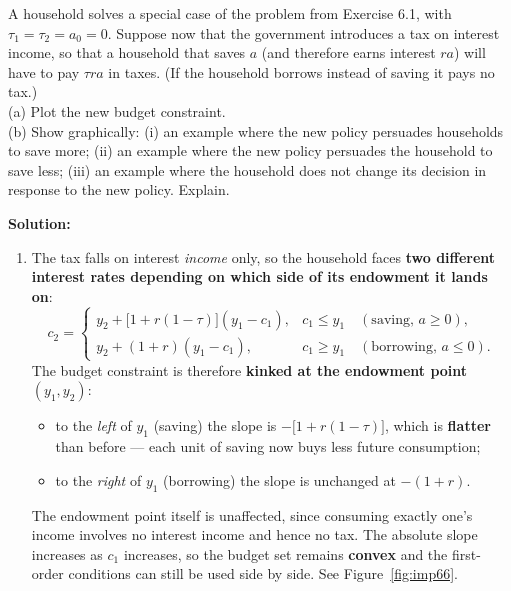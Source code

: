 \documentclass[12pt, letterpaper]{article}
\begin{document}
\begin{tcolorbox}[evenbox,title={Problem 6.6 \quad A Tax on Savings}]
\begin{tcolorbox}[questionbox]
A household solves a special case of the problem from Exercise 6.1, with
$\tau_1=\tau_2=a_0=0$. Suppose now that the government introduces a tax on interest income,
so that a household that saves $a$ (and therefore earns interest $ra$) will have to pay
$\tau ra$ in taxes. (If the household borrows instead of saving it pays no tax.)\\[3pt]
(a) Plot the new budget constraint.\\[3pt]
(b) Show graphically: (i) an example where the new policy persuades households to save more;
(ii) an example where the new policy persuades the household to save less; (iii) an example
where the household does not change its decision in response to the new policy. Explain.
\end{tcolorbox}

\textbf{Solution:}
\begin{enumerate}

\item The tax falls on interest \emph{income} only, so the household faces \textbf{two
different interest rates depending on which side of its endowment it lands on}:
\[
c_2=
\begin{cases}
y_2+\bigl[1+r(1-\tau)\bigr](y_1-c_1), & c_1\le y_1 \quad(\text{saving, }a\ge0),\\[4pt]
y_2+(1+r)(y_1-c_1), & c_1\ge y_1 \quad(\text{borrowing, }a\le0).
\end{cases}
\]
The budget constraint is therefore \textbf{kinked at the endowment point} $(y_1,y_2)$:
\begin{itemize}[leftmargin=1.3em,itemsep=2pt,topsep=3pt]
\item to the \emph{left} of $y_1$ (saving) the slope is $-\bigl[1+r(1-\tau)\bigr]$, which is
      \textbf{flatter} than before --- each unit of saving now buys less future consumption;
\item to the \emph{right} of $y_1$ (borrowing) the slope is unchanged at $-(1+r)$.
\end{itemize}
The endowment point itself is unaffected, since consuming exactly one's income involves no
interest income and hence no tax. The absolute slope increases as $c_1$ increases, so the
budget set remains \textbf{convex} and the first-order conditions can still be used side by
side. See Figure~\ref{fig:imp66}.


\end{enumerate}
\end{tcolorbox}
\end{document}
